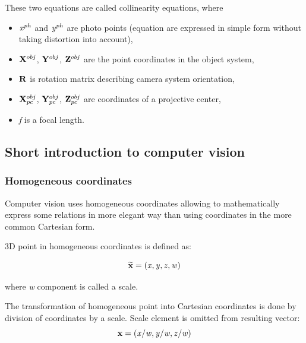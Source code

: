 \documentclass[a4paper,12pt]{article}
\newcommand{\ematr}[1]{%
{\bf #1}%
}
\newcommand{\evect}[1]{%
{\bf #1}%
}
\newcommand{\ehvect}[1]{%
{\bf \widetilde{#1}}%
}
\newcommand{\escal}[1]{%
{\it #1}%
}
\begin{document}
\noindent These two equations are called collinearity equations, where
\begin{itemize}
  \item $\escal{x}^{ph}$ and $\escal{y}^{ph}$ are photo points (equation are expressed in simple form without taking distortion into account),
  \item $\evect{X}^{obj}$, $\evect{Y}^{obj}$, $\evect{Z}^{obj}$ are the point coordinates in the object system,
  \item $\ematr{R}$ is rotation matrix describing camera system orientation,
  \item $\evect{X}^{obj}_{pc}$, $\evect{Y}^{obj}_{pc}$, $\evect{Z}^{obj}_{pc}$ are coordinates of a projective center,
  \item \escal{f} is a focal length.
\end{itemize}


\subsection{Short introduction to computer vision}


\subsubsection{Homogeneous coordinates}



Computer vision uses homogeneous coordinates allowing to mathematically express some relations
 in more elegant way than using coordinates in the more common Cartesian form. 

3D point in homogeneous coordinates is defined as:

\begin{equation}
\ehvect{x} = (\escal{x}, \escal{y}, \escal{z}, \escal{w})
\end{equation}

where \escal{w} component is called a scale.

The transformation of homogeneous point into Cartesian coordinates is done by division of
 coordinates by a scale. Scale element is omitted from resulting vector:
\begin{equation}
\evect{x} = (\escal{x} / \escal{w}, \escal{y} / \escal{w}, \escal{z} / \escal{w})
\end{equation}
\end{document}
